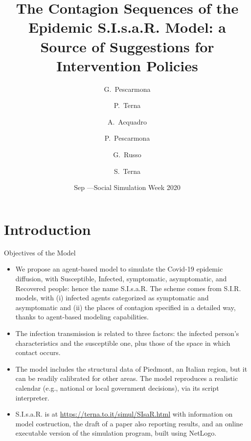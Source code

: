 \documentclass[8pt]{beamer}
\title[S.I.s.a.R. Epidemic Model] %
{The Contagion Sequences of the Epidemic S.I.s.a.R. Model: a Source of Suggestions for Intervention Policies}
\author[] %
{G.~Pescarmona\inst{1} \and P.~Terna\inst{2} \and A.~Acquadro\inst{1} \and P.~Pescarmona\inst{3} \and G.~Russo\inst{4}  
\and S.~Terna\inst{5}  }
\institute[] %
{
  \inst{1}%
 University of Torino, Italy
  \and
  \inst{2}%
  University of Torino, Italy, retired \& Collegio Carlo Alberto, Italy
 \and
  \inst{3}%
  University of Groningen, The Netherlands  
  \and
  \inst{4}%
  Centro Einaudi, Torino, Italy
  \and
  \inst{5}%
 tomorrowdata.io
  }
\date[] %
{Sep \nth{16}---Social Simulation Week 2020}
\begin{document}
\begin{frame}
  \titlepage
\end{frame}


\section{Introduction}

\begin{frame}{Objectives of the Model}

  \begin{itemize}
  \item
We propose an agent-based model to simulate the Covid-19 epidemic diffusion, with Susceptible, Infected, symptomatic, asymptomatic, and Recovered people: hence the name S.I.s.a.R. The scheme comes from S.I.R. models, with (i) infected agents categorized as symptomatic and asymptomatic and (ii) the places of contagion specified in a detailed way, thanks to agent-based modeling capabilities. 

 \item
The infection transmission is related to three factors: the infected person's characteristics and the susceptible one, plus those of the space in which contact occurs.

  \item
The model includes the structural data of Piedmont, an Italian region, but it can be readily calibrated for other areas. The model reproduces a realistic calendar (e.g., national or local government decisions), via its script interpreter.  

\bigskip

 \item
 
S.I.s.a.R. is at \url{https://terna.to.it/simul/SIsaR.html} with information on model costruction, the draft of a paper also reporting results, and an online executable version of the simulation program, built using NetLogo.

 \end{itemize}
\end{frame}
\end{document}
